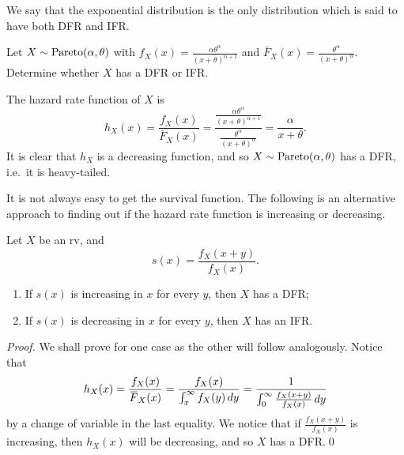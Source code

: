 \documentclass[notoc,notitlepage]{tufte-book}
\begin{document}
\begin{note}
  We say that the exponential distribution is the only distribution which is said to have both DFR and IFR.
\end{note}

\begin{eg}
  Let $X \sim \operatorname{Pareto}(\alpha, \theta)$ with $f_X(x) = \frac{\alpha \theta^\alpha}{{(x + \theta)}^{\alpha + 1}}$ and $\bar{F}_X(x) = \frac{\theta^\alpha}{{(x + \theta)}^\alpha}$. Determine whether $X$ has a DFR or IFR.
\end{eg}

\begin{solution}
  The hazard rate function of $X$ is
  \begin{equation*}
    h_X(x) = \frac{f_X(x)}{\bar{F}_X(x)} = \frac{\frac{\alpha \theta^\alpha}{{(x + \theta)}^{\alpha + 1}}}{\frac{\theta^\alpha}{{(x + \theta)}^\alpha}} = \frac{\alpha}{x + \theta}.
  \end{equation*}
  It is clear that $h_X$ is a decreasing function, and so $X \sim \operatorname{Pareto}(\alpha, \theta)$ has a DFR, i.e.\ it is heavy-tailed.
\end{solution}

It is not always easy to get the survival function. The following is an alternative approach to finding out if the hazard rate function is increasing or decreasing.

\begin{propo}\label{propo:ratio_comparison_for_dfr_ifr}
  Let $X$ be an rv, and
  \begin{equation*}
    s(x) = \frac{f_X(x + y)}{f_X(x)}.
  \end{equation*}
  \begin{enumerate}
    \item If $s(x)$ is increasing in $x$ for every $y$, then $X$ has a DFR;
    \item If $s(x)$ is decreasing in $x$ for every $y$, then $X$ has an IFR.
  \end{enumerate}
\end{propo}

\begin{proof}
  We shall prove for one case as the other will follow analogously. Notice that
  \begin{equation*}
    h_X(x) = \frac{f_X(x)}{\bar{F}_X(x)} = \frac{f_X(x)}{\int_{x}^{\infty} f_X(y) \dif{y}} = \frac{1}{\int_{0}^{\infty} \frac{f_X(x + y)}{f_X(x)}\dif{y} }
  \end{equation*}
  by a change of variable in the last equality. We notice that if $\frac{f_X(x + y)}{f_X(x)}$ is increasing, then $h_X(x)$ will be decreasing, and so $X$ has a DFR.\qed\
\end{proof}
\end{document}
